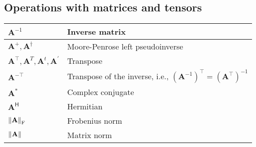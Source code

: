 \subsection{Operations with matrices and tensors}
\begin{xltabular}{\textwidth}{XX}
	\(\mathbf{A}^{-1}\)                                                                                  & Inverse matrix                                                                                                                                                                  \\ \hline
	\(\mathbf{A}^+, \mathbf{A}^{\dagger}\)                                                               & Moore-Penrose left pseudoinverse                                                                                                                                                \\ \hline
	\(\mathbf{A}^\top, \mathbf{A}^T, \mathbf{A}^t, \mathbf{A}^{'}\) \cite{searleMatrixAlgebraUseful2017} & Transpose                                                                                                                                                                       \\ \hline
	\(\mathbf{A}^{-\top}\)                                                                               & Transpose of the inverse, i.e., \(\left( \mathbf{A}^{-1} \right)^{\top} = \left( \mathbf{A}^{\top} \right)^{-1}\) \cite{petersenMatrixCookbook2008,golubMatrixComputations2013} \\ \hline
	\(\mathbf{A}^*\)                                                                                     & Complex conjugate                                                                                                                                                               \\ \hline
	\(\mathbf{A}^\mathsf{H}\)                                                                            & Hermitian                                                                                                                                                                       \\ \hline
	\(\norm{\mathbf{A}}_\textrm{F}\)                                                                                & Frobenius norm                                                                                                                                                                  \\ \hline
	\(\norm{\mathbf{A}}\)                                                                                & Matrix norm                                                                                                                                                                     \\ \hline

\end{xltabular}
